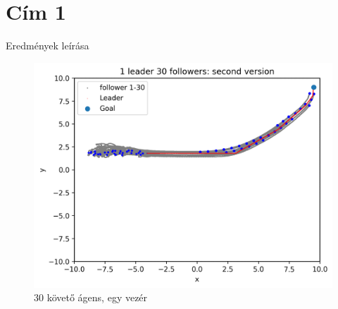 \section{Cím 1}
Eredmények leírása
\begin{figure}[h]
    \centering
    \includegraphics[scale=0.8]{figures/images/results/swarm_second_version.png}
    \caption{30 követő ágens, egy vezér}
    \label{fig:result_30_foll_1_lead}
\end{figure}



